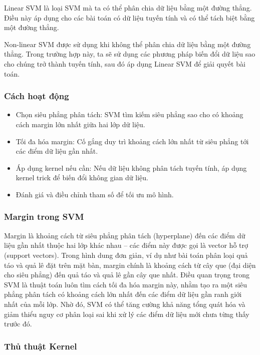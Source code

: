 \documentclass[
]{article}
\providecommand{\tightlist}{%
  \setlength{\itemsep}{0pt}\setlength{\parskip}{0pt}}
\begin{document}
Linear SVM là loại SVM mà ta có thể phân chia dữ liệu bằng một đường
thẳng. Điều này áp dụng cho các bài toán có dữ liệu tuyến tính và có thể
tách biệt bằng một đường thẳng.

Non-linear SVM được sử dụng khi không thể phân chia dữ liệu bằng một
đường thẳng. Trong trường hợp này, ta sẽ sử dụng các phương pháp biến
đổi dữ liệu sao cho chúng trở thành tuyến tính, sau đó áp dụng Linear
SVM để giải quyết bài toán.

\subsubsection{Cách hoạt động}\label{cuxe1ch-houx1ea1t-ux111ux1ed9ng}

\begin{itemize}
\tightlist
\item
  Chọn siêu phẳng phân tách: SVM tìm kiếm siêu phẳng sao cho có khoảng
  cách margin lớn nhất giữa hai lớp dữ liệu.
\item
  Tối đa hóa margin: Cố gắng duy trì khoảng cách lớn nhất từ siêu phẳng
  tới các điểm dữ liệu gần nhất.
\item
  Áp dụng kernel nếu cần: Nếu dữ liệu không phân tách tuyến tính, áp
  dụng kernel trick để biến đổi không gian dữ liệu.
\item
  Đánh giá và điều chỉnh tham số để tối ưu mô hình.
\end{itemize}

\subsubsection{Margin trong SVM}\label{margin-trong-svm}

Margin là khoảng cách từ siêu phẳng phân tách (hyperplane) đến các điểm
dữ liệu gần nhất thuộc hai lớp khác nhau -- các điểm này được gọi là
vector hỗ trợ (support vectors). Trong hình dung đơn giản, ví dụ như bài
toán phân loại quả táo và quả lê đặt trên mặt bàn, margin chính là
khoảng cách từ cây que (đại diện cho siêu phẳng) đến quả táo và quả lê
gần cây que nhất. Điều quan trọng trong SVM là thuật toán luôn tìm cách
tối đa hóa margin này, nhằm tạo ra một siêu phẳng phân tách có khoảng
cách lớn nhất đến các điểm dữ liệu gần ranh giới nhất của mỗi lớp. Nhờ
đó, SVM có thể tăng cường khả năng tổng quát hóa và giảm thiểu nguy cơ
phân loại sai khi xử lý các điểm dữ liệu mới chưa từng thấy trước đó.

\subsubsection{Thủ thuật Kernel}\label{thux1ee7-thuux1eadt-kernel}
\end{document}
